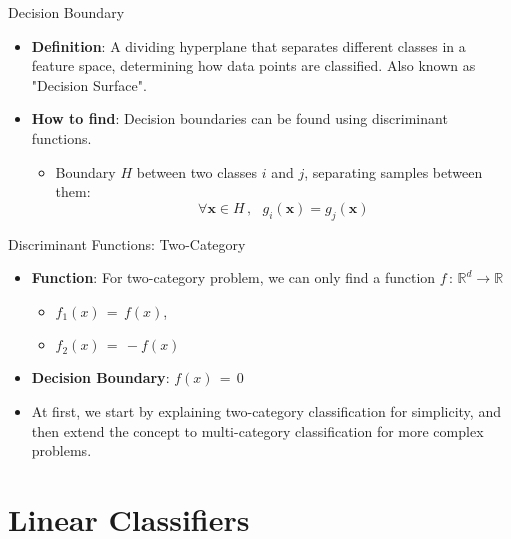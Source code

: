 \documentclass[serif, aspectratio=169]{beamer}
\begin{document}
\begin{frame}{Decision Boundary}
    \begin{itemize}\itemsep2em
        \item \justifying \textbf{Definition}: A dividing hyperplane that separates different classes in a feature space, determining how data points are classified. Also known as "Decision Surface".
        
        \item \justifying \textbf{How to find}: Decision boundaries can be found using discriminant functions.
        \begin{itemize}
            \item Boundary $H$ between two classes $i$ and $j$, separating samples between them:
            $$
                \forall \mathbf{x} \in H \, ,\, \, \, \, g_i(\mathbf{x}) = g_j(\mathbf{x})
            $$
        \end{itemize}
    \end{itemize}
\end{frame}

\begin{frame}{Discriminant Functions: Two-Category}
    \begin{itemize}\itemsep1.5em
        \item \justifying \textbf{Function}: For two-category problem, we can only find a function $f \, : \, \mathbb{R}^d \rightarrow \mathbb{R}$
        \begin{itemize}
            \item $f_1(x) \, = \, f(x)$,
            \item $f_2(x) \, = \, -f(x)$
        \end{itemize}
        \item \textbf{Decision Boundary}: $f(x) \, = \, 0$
        \item \justifying At first, we start by explaining two-category classification for simplicity, and then extend the concept to multi-category classification for more complex problems.
    \end{itemize}
\end{frame}


\section{Linear Classifiers}
\end{document}
